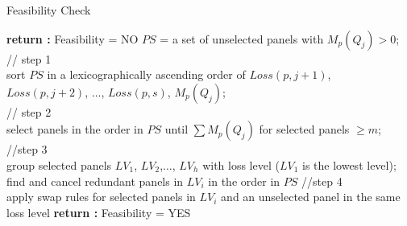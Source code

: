 \documentclass[conference]{IEEEtran}
\begin{document}
\begin{algorithm}
\caption{Feasibility Check}
\LinesNumbered
{}  
    {{
       {\textup{\textbf{return :}} Feasibility = NO}}
     $PS$ = a set of unselected panels with $M_{p}(Q_{j}) > 0$;\\
     // step 1\\
     sort $PS$ in a lexicographically ascending order of $Loss(p,j+1)$, $Loss(p,j+2)$, $\ldots$, $Loss(p,s)$, $M_{p}(Q_{j})$;\\
     // step 2\\
     select panels in the order in $PS$ until $\sum M_{p}(Q_{j})$ for selected panels $\geq m$;\\
     //step 3\\
     group selected panels $LV_{1}$, $LV_{2}$,$\ldots$, $LV_{h}$ with loss level ($LV_{1}$ is the lowest level);\\
     {find and cancel redundant panels in $LV_{i}$ in the order in $PS$}
     //step 4\\
     {apply swap rules for selected panels in $LV_{i}$ and an unselected panel in the same loss level}
    }
    \textup{\textbf{return :}} Feasibility = YES
\end{algorithm}
\end{document}
